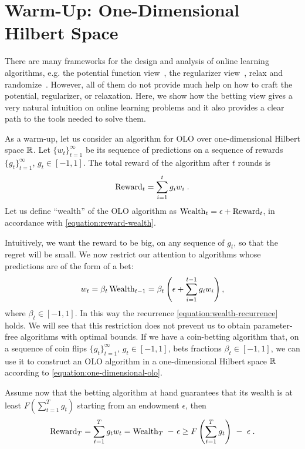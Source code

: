 \section{Warm-Up: One-Dimensional Hilbert Space}
\label{section:one-dimensional-hilbert-space-olo}

There are many frameworks for the design and analysis of online learning
algorithms, e.g. the potential function view~\cite{Cesa-Bianchi-Lugosi-2006},
the regularizer view~\cite{Shalev-Shwartz-2011}, relax and
randomize~\cite{Rakhlin-Shamir-Sridharan-2012}. However, all of them do not
provide much help on how to craft the potential, regularizer, or relaxation.
Here, we show how the betting view gives a very natural intuition on online
learning problems and it also provides a clear path to the tools needed to
solve them.

As a warm-up, let us consider an algorithm for OLO over one-dimensional Hilbert
space $\mathbb{R}$.  Let $\{w_t\}_{t=1}^\infty$ be its sequence of predictions on a
sequence of rewards $\{g_t\}_{t=1}^\infty$, $g_t \in [-1,1]$. The total reward
of the algorithm after $t$ rounds is
\[
\operatorname{Reward}_t = \sum_{i=1}^t g_i w_i \; .
\]
Let us define ``wealth'' of the OLO algorithm as $\operatorname{Wealth}_t = \epsilon +
\operatorname{Reward}_t$, in accordance with \eqref{equation:reward-wealth}.

Intuitively, we want the reward to be big, on any sequence of $g_t$, so that
the regret will be small. We now restrict our attention to algorithms whose
predictions are of the form of a bet:
\begin{equation}
\label{equation:one-dimensional-olo}
w_t = \beta_t \operatorname{Wealth}_{t-1}
= \beta_t \left(\epsilon+ \sum_{i=1}^{t-1} g_i w_i \right),
\end{equation}
where $\beta_t \in [-1,1]$. In this way the recurrence
\eqref{equation:wealth-recurrence} holds. We will see that this restriction
does not prevent us to obtain parameter-free algorithms with optimal bounds.
If we have a coin-betting algorithm that, on a sequence of coin flips
$\{g_t\}_{t=1}^\infty$, $g_t \in [-1,1]$, bets fractions $\beta_t \in [-1,1]$,
we can use it to construct an OLO algorithm in a one-dimensional Hilbert space
$\mathbb{R}$ according to \eqref{equation:one-dimensional-olo}.

Assume now that the betting algorithm at hand guarantees that its wealth is at
least $F(\sum_{t=1}^T g_t)$ starting from an endowment $\epsilon$, then
\begin{equation}
\label{equation:one-dimensional-olo-reward-lower-bound}
\Reward_T
= \sum_{t=1}^T g_t w_t
= \Wealth_T \ - \ \epsilon \ge F\left(\sum_{t=1}^T g_t \right) \ - \ \epsilon \; .
\end{equation}

